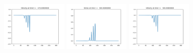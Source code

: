 \documentclass[11pt]{article}
\begin{document}
\includegraphics[width=0.2375\textwidth]{frame0019fig2.png}
\vskip 10pt 
\includegraphics[width=0.2375\textwidth]{frame0020fig1.png}
\includegraphics[width=0.2375\textwidth]{frame0020fig2.png}
\end{document}
